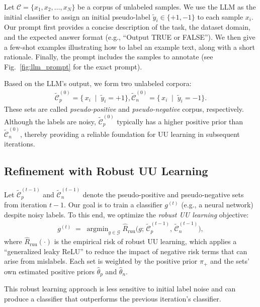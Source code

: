 Let $\mathcal{C} = \{ x_1, x_2,\dots, x_N \}$ be a corpus of unlabeled samples. We use the LLM as the initial classifier to assign an initial pseudo-label $\tilde{y}_i \in \{+1, -1\}$ to each sample $x_i$. Our prompt first provides a concise description of the task, the dataset domain, and the expected answer format (e.g., “Output TRUE or FALSE”). We then give a few-shot examples illustrating how to label an example text, along with a short rationale. Finally, the prompt includes the samples to annotate (see Fig.~\ref{fig:llm_prompt} for the exact prompt).

Based on the LLM’s output, we form two unlabeled corpora:
\begin{align*}
    \widetilde{\mathcal{C}}^{(0)}_{p} = \{\, x_i \;\mid\; \tilde{y}_i = +1 \}, \widetilde{\mathcal{C}}^{(0)}_{n} = \{\, x_i \;\mid\; \tilde{y}_i = -1 \}.
\end{align*}
These sets are called \emph{pseudo-positive} and \emph{pseudo-negative} corpus, respectively. Although the labels are noisy, $\widetilde{\mathcal{C}}^{(0)}_{p}$ typically has a higher positive prior than $\widetilde{\mathcal{C}}^{(0)}_{n}$, thereby providing a reliable foundation for UU learning in subsequent iterations.

\subsection{Refinement with Robust UU Learning}
\label{subsec:train}
Let $\widetilde{\mathcal{C}}_{p}^{(t-1)}$ and $\widetilde{\mathcal{C}}_{n}^{(t-1)}$ denote the pseudo-positive and pseudo-negative sets from iteration $t-1$. Our goal is to train a classifier $g^{(t)}$ (e.g., a neural network) despite noisy labels. To this end, we optimize the \emph{robust UU learning} objective:
\begin{align*}
g^{(t)}
\;=\;
 {\operatorname{argmin}}_{g \in \mathcal{G}}
\widehat{R}_{\mathrm{ruu}}\bigl(g;\,\widetilde{\mathcal{C}}_{p}^{(t-1)},\,\widetilde{\mathcal{C}}_{n}^{(t-1)}\bigr),
\end{align*}
where $\widehat{R}_{\mathrm{ruu}}(\cdot)$ is the empirical risk of robust UU learning, which applies a ``generalized leaky ReLU'' to reduce the impact of negative risk terms that can arise from mislabels. Each set is weighted by the positive prior $\pi_+$ and the sets’ own estimated positive priors $\hat{\theta}_{p}$ and $\hat{\theta}_{n}$.

This robust learning approach is less sensitive to initial label noise and can produce a classifier that outperforms the previous iteration's classifier.




